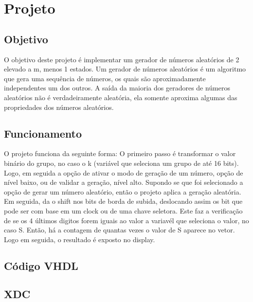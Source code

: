 \documentclass[12pts]{article}
\begin{document}
\section{Projeto}
\iffalse
Parte Experimental, descrevendo os passos realizados, dificuldades e soluções para os problemas encontrados. Aqui, deve-se apresentar uma descrição dos resultados encontrados em forma de figuras, gráficos e tabelas.
\fi

\singlespacing

\subsection{Objetivo}
	O objetivo deste projeto é implementar um gerador de números aleatórios de 2 elevado a m, menos 1 estados. Um gerador de números aleatórios é um algoritmo que gera uma sequência de números, os quais são aproximadamente independentes um dos outros. A saída da maioria dos geradores de números
aleatórios não é verdadeiramente aleatória, ela somente aproxima algumas das propriedades dos
números aleatórios.
		
\subsection{Funcionamento}
	O projeto funciona da seguinte forma: O primeiro passo é transformar o valor binário do grupo, no caso o k (variável que seleciona um grupo de até 16 bits). Logo, em seguida a opção de ativar o modo de geração de um número, opção de nível baixo, ou de validar a geração, nível alto. Supondo se que foi selecionado a opção de gerar um número aleatório, então o projeto aplica a geração aleatória. Em seguida, da o shift nos bits de borda de subida, deslocando assim os bit que pode ser com base em um clock ou de uma chave seletora. Este faz a verificação de se os 4 últimos digitos forem iguais ao valor a variavél que seleciona o valor, no caso S. Então, há a contagem de quantas vezes o valor de S aparece no vetor. Logo em seguida, o resultado é exposto no display.

\clearpage
\subsection{Código VHDL}


\clearpage
\subsection{XDC}

\end{document}
